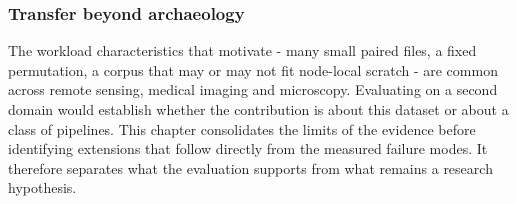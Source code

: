 \subsubsection{Transfer beyond archaeology}
The workload characteristics that motivate \pads{} - many small paired files, a
fixed permutation, a corpus that may or may not fit node-local scratch - are
common across remote sensing, medical imaging and microscopy.
Evaluating on a second domain would establish whether the contribution is about this
dataset or about a class of pipelines.
This chapter consolidates the limits of the evidence before identifying extensions
that follow directly from the measured failure modes. It therefore separates what
the evaluation supports from what remains a research hypothesis.
